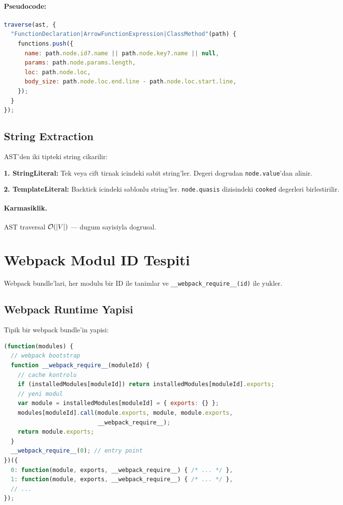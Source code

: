\paragraph{Pseudocode:}
\begin{lstlisting}[language=JavaScript, caption={Fonksiyon extraction pseudocode}]
traverse(ast, {
  "FunctionDeclaration|ArrowFunctionExpression|ClassMethod"(path) {
    functions.push({
      name: path.node.id?.name || path.node.key?.name || null,
      params: path.node.params.length,
      loc: path.node.loc,
      body_size: path.node.loc.end.line - path.node.loc.start.line,
    });
  }
});
\end{lstlisting}

\subsection{String Extraction}

AST'den iki tipteki string cikarilir:

\textbf{1. StringLiteral:} Tek veya cift tirnak icindeki sabit string'ler. Degeri dogrudan \texttt{node.value}'dan alinir.

\textbf{2. TemplateLiteral:} Backtick icindeki sablonlu string'ler. \texttt{node.quasis} dizisindeki \texttt{cooked} degerleri birlestirilir.

\paragraph{Karmasiklik.} AST traversal $\mathcal{O}\!\left(|V|\right)$ --- dugum sayisiyla dogrusal.


\section{Webpack Modul ID Tespiti}
\label{sec:webpack-modules}

Webpack bundle'lari, her modulu bir ID ile tanimlar ve \texttt{\_\_webpack\_require\_\_(id)} ile yukler.

\subsection{Webpack Runtime Yapisi}

Tipik bir webpack bundle'in yapisi:

\begin{lstlisting}[language=JavaScript, caption={Webpack bundle yapisi (basitlestirilmis)}]
(function(modules) {
  // webpack bootstrap
  function __webpack_require__(moduleId) {
    // cache kontrolu
    if (installedModules[moduleId]) return installedModules[moduleId].exports;
    // yeni modul
    var module = installedModules[moduleId] = { exports: {} };
    modules[moduleId].call(module.exports, module, module.exports,
                           __webpack_require__);
    return module.exports;
  }
  __webpack_require__(0); // entry point
})({
  0: function(module, exports, __webpack_require__) { /* ... */ },
  1: function(module, exports, __webpack_require__) { /* ... */ },
  // ...
});
\end{lstlisting}

